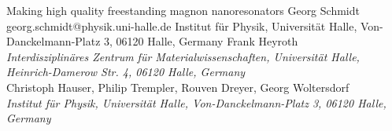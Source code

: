 \begin{conf-abstract}[]
{Making high quality freestanding magnon nanoresonators}
{\color{blue} Georg Schmidt}
{georg.schmidt@physik.uni-halle.de}
{Institut für Physik, Universität Halle, Von-Danckelmann-Platz 3, 06120 Halle, Germany}
{{\color{blue}Frank Heyroth}\\ \textit{Interdisziplinäres Zentrum für Materialwissenschaften, Universität Halle, Heinrich-Damerow Str. 4, 06120 Halle, Germany}\\ 
{\color{blue}Christoph Hauser, Philip Trempler, Rouven Dreyer, Georg Woltersdorf}\\ \textit{ Institut für Physik, Universität Halle, Von-Danckelmann-Platz 3, 06120 Halle, Germany}\\ 
\decofourleft \decofourright}





\printbibliography[heading=none]

\end{conf-abstract}
